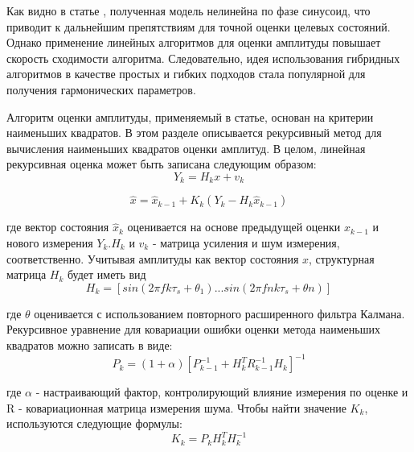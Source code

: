 Как видно в статье \cite{enayati2017real}, полученная модель нелинейна по фазе синусоид, что приводит к дальнейшим препятствиям для точной оценки целевых состояний. Однако применение линейных алгоритмов для оценки амплитуды повышает скорость сходимости алгоритма. Следовательно, идея использования гибридных алгоритмов в качестве простых и гибких подходов стала популярной для получения гармонических параметров.

Алгоритм оценки амплитуды, применяемый в \cite{enayati2017real} статье, основан на критерии наименьших квадратов. В этом разделе описывается рекурсивный метод для вычисления наименьших квадратов оценки амплитуд. В целом, линейная рекурсивная оценка может быть записана следующим образом:
\begin{equation}
\label{eq:equation1.20}	
	Y_{k}=H_{k}x+v_{k}
\end{equation}

\begin{equation}
\label{eq:equation1.21}
	\widehat{x} = \widehat{x}_{k-1}+K_{k}(Y_{k} -H_{k} \widehat{x}_{k-1})
\end{equation}

где вектор состояния $\widehat{x}_{k}$ оценивается на основе предыдущей оценки $\widehat{x}_{k-1}$ и нового измерения $Y_{k}$.$ H_{k}$ и $ v_{k}$ - матрица усиления и шум измерения, соответственно. Учитывая амплитуды как вектор состояния $x$, структурная матрица $H_{k}$ будет иметь вид
\begin{equation}
\label{eq:equation1.22}
	H_{k}= [sin(2\pi f k\tau_{s}  + \theta_{1}) ...sin(2\pi f nk\tau_{s}+ \theta n)]
\end{equation}

где $\theta$ оценивается с использованием повторного расширенного фильтра Калмана. Рекурсивное уравнение для ковариации ошибки оценки метода наименьших квадратов можно записать в виде:
\begin{equation}
\label{eq:equation1.23}
	P_{k} =(1+\alpha)[P_{k-1}^{-1}+H_{k}^{T} R_{k-1}^{-1} H_{k}]^{-1}
\end{equation}

где $\alpha$ - настраивающий фактор, контролирующий влияние измерения по оценке и R - ковариационная матрица измерения шума. Чтобы найти значение $K_{k}$, используются следующие формулы:
\begin{equation}
\label{eq:equation1.24}
	K_{k} = P_{k} H_{k}^{T} H_{k}^{-1}
\end{equation}

